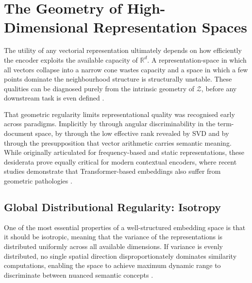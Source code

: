 \section{The Geometry of High-Dimensional Representation Spaces}
\label{sec:geometry}

The utility of any vectorial representation ultimately depends on how efficiently the encoder exploits the available capacity of $\mathbb{R}^d$. A representation-space in which all vectors collapse into a narrow cone wastes capacity and a space in which a few points dominate the neighbourhood structure is structurally unstable. These qualities can be diagnosed purely from the intrinsic geometry of $\mathcal{Z}$, before any downstream task is even defined \cite{ethayarajh-2019-contextual, GaoHTQWL19}. 

That geometric regularity limits representational quality was recognised early across paradigms. Implicitly by \citet{Salton_AVS_1975} through angular discriminability in the term-document space, by \citet{Deerwester_1990_Indexing} through the low effective rank revealed by \acs{SVD} and by \citet{Mikolov2013} through the presupposition that vector arithmetic carries semantic meaning. While originally articulated for frequency-based and static representations, these desiderata prove equally critical for modern contextual encoders, where recent studies demonstrate that Transformer-based embeddings also suffer from geometric pathologies \citep{mu2018allbutthetop, ethayarajh-2019-contextual, bis_too_2021}. 



\subsection{Global Distributional Regularity: Isotropy}
\label{sec:isotropy}

One of the most essential properties of a well-structured embedding space is that it should be isotropic, meaning that the variance of the representations is distributed uniformly across all available dimensions.  If variance is evenly distributed, no single spatial direction disproportionately dominates similarity computations, enabling the space to achieve maximum dynamic range to discriminate between nuanced semantic concepts \cite{rudman-etal-2022-isoscore, Cai2021IsotropyIT}.


